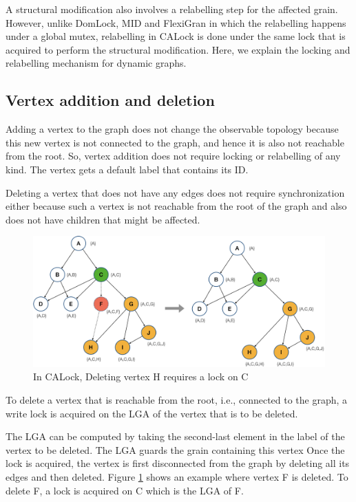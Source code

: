 A structural modification also involves a relabelling step for the affected grain. However, unlike DomLock, MID and FlexiGran in which the relabelling happens under a global mutex, relabelling in CALock is done under the same lock that is acquired to perform the structural modification. 
Here, we explain the locking and relabelling mechanism for dynamic graphs.

\subsection{Vertex addition and deletion}
Adding a vertex to the graph does not change the observable topology because this new vertex is not connected to the graph, and hence it is also not reachable from the root. 
So, vertex addition does not require locking or relabelling of any kind. The vertex gets a default label that contains its ID. 

Deleting a vertex that does not have any edges does not require synchronization either because such a vertex is not reachable from the root of the graph and also does not have children that might be affected.

\begin{figure}[h]
	\centering
	\captionsetup{justification=centering}
	\includegraphics[width=\columnwidth]{figures/CALock_to_delete_vertex.png}
	\caption{In CALock, Deleting vertex H requires a lock on C}
	\label{fig:calockdelete}
\end{figure}

To delete a vertex that is reachable from the root, i.e., connected to the graph, a write lock is acquired on the LGA of the vertex that is to be deleted. 

The LGA can be computed by taking the second-last element in the label of the vertex to be deleted. The LGA guards the grain containing this vertex
Once the lock is acquired, the vertex is first disconnected from the graph by deleting all its edges and then deleted. Figure \ref{fig:calockdelete} shows an example where vertex F is deleted. To delete F, a lock is acquired on C which is the LGA of F.

